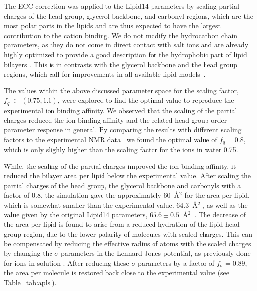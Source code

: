 \documentclass[aip,jcp,twocolumn]{revtex4}
\begin{document}
The ECC correction was applied to the Lipid14 parameters by scaling partial charges of the head group,
glycerol backbone, and carbonyl regions, which are the most polar parts in the  lipids and
are thus expected to have the largest contribution to the cation binding.
We do not modify the hydrocarbon chain parameters, as they
do not come in direct contact with salt ions and are
already highly optimized to provide a good description for the
hydrophobic part of lipid bilayers \cite{ollila16}.
This is in contrasts with the glycerol backbone and the head group regions, 
which call for improvements in all available lipid models~\cite{botan15}.

The values within the above discussed parameter space for the scaling factor, $f_q~\in~(0.75, 1.0)$,
were explored to find the optimal value to reproduce the experimental ion binding affinity.
We observed that the scaling
of the partial charges reduced the ion binding affinity and the 
related head group order parameter response in general.
By comparing the results with different scaling factors to the experimental 
NMR data~\cite{akutsu81,altenbach84,scherer89} we found the optimal 
value of $f_q = 0.8$,
which is only slighly higher than the scaling factor for the ions in water 0.75.

While, the scaling of the partial charges improved the ion binding affinity,
it reduced the bilayer area per lipid below the experimental value. 
After scaling the partial charges of the head group, the glycerol
backbone and carbonyls with a factor of 0.8, the simulation gave 
the approximately 60~\AA$^2$ for the area per lipid,
which is somewhat smaller than the experimental value, 64.3~\AA$^2$ \cite{kucerka11}, 
as well as the value given by the original Lipid14 parameters, $65.6 \pm 0.5$~\AA$^2$~\cite{dickson14}.
The decrease of the area per lipid is found to arise from a reduced hydration of the lipid head group region,
due to the lower polarity of molecules with scaled charges. This can be compensated
by reducing the effective radius of atoms with the scaled charges by changing 
the $\sigma$ parameters in the Lennard-Jones potential, 
as previously done for ions in solution \cite{kohagen14,kohagen16,Pluharova2014}.
After reducing these $\sigma$ parameters by a factor of $f_\sigma = 0.89$, the area per molecule is restored
back close to the experimental value (see Table~\ref{tab:apls}). 
\end{document}
